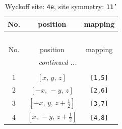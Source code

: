 \documentclass[fleqn,8pt]{jsarticle}
\begin{document}
\begin{longtable}{ccc}
\caption{Wyckoff site: {\tt 4e}, site symmetry: {\tt 11'}}
 \\
 \hline \hline
No. & position & mapping \\ \hline \endfirsthead

\multicolumn{2}{l}{\tablename\ \thetable{}} \\
 \hline \hline
No. & position & mapping \\ \hline \endhead

 \hline \hline
\multicolumn{2}{r}{\footnotesize\it continued ...} \\ \endfoot

 \hline \hline
\multicolumn{2}{r}{} \\ \endlastfoot

1 & $\left[ x,\, y,\, z \right]$ & {\tt [1,5]} \\ \hline
2 & $\left[ - x,\, - y,\, z \right]$ & {\tt [2,6]} \\ \hline
3 & $\left[ - x,\, y,\, z + \frac{1}{2} \right]$ & {\tt [3,7]} \\ \hline
4 & $\left[ x,\, - y,\, z + \frac{1}{2} \right]$ & {\tt [4,8]} \\
\end{longtable}
\end{document}
